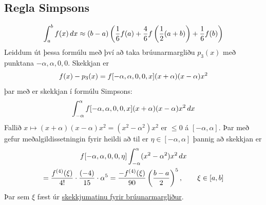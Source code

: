 \documentclass[letterpaper,10pt,icelandic]{sphinxmanual}
\begin{document}
\subsection{Regla Simpsons}
\label{kafli05:id7}\begin{gather}
\begin{split}\int_a^b f(x)\,dx \approx (b-a)
  \left(
    \frac{1}{6}f(a) + \frac{4}{6}f
    \left( \frac{1}{2}(a+b) \right) + \frac{1}{6}f(b)
  \right)\end{split}\notag
\end{gather}
Leiddum út þessa formúlu með því að taka brúunarmargliðu \(p_3(x)\)
með punktana \(-\alpha, \alpha, 0, 0\). Skekkjan er
\begin{gather}
\begin{split}f(x) - p_3(x) = f[-\alpha, \alpha, 0, 0, x]
  (x+\alpha)(x-\alpha)x^2\end{split}\notag
\end{gather}
þar með er skekkjan í formúlu Simpsons:
\begin{gather}
\begin{split}\int_{-\alpha}^{\alpha}f[-\alpha, \alpha, 0, 0, x]
  (x+\alpha)(x-\alpha)x^2 \,dx\end{split}\notag
\end{gather}
Fallið \(x\mapsto (x+\alpha)(x-\alpha)x^2 = (x^2 - \alpha^2)x^2\) er
\(\leq 0\) á \([-\alpha, \alpha]\). Þar með gefur
meðalgildissetningin fyrir heildi að til er
\(\eta \in [-\alpha, \alpha]\) þannig að skekkjan er
\begin{gather}
\begin{split}\begin{gathered}
  f[-\alpha, \alpha, 0, 0, \eta]
  \int_{-\alpha}^{\alpha}(x^2 - \alpha^2)x^2 \,dx \\
  = \frac{f^{(4)}(\xi)}{4!}\cdot \frac{(-4)}{15}\cdot \alpha^5
  = \frac{-f^{(4)}(\xi)}{90}\left(\frac{b-a}{2}\right)^5, \qquad
  \xi \in [a,b]\end{gathered}\end{split}\notag
\end{gather}
Þar sem \(\xi\) fæst úr
\href{https://notendur.hi.is/~bsm/stae405/kafli03.html\#id9}{skekkjumatinu fyrir brúunarmargliður}.
\end{document}
